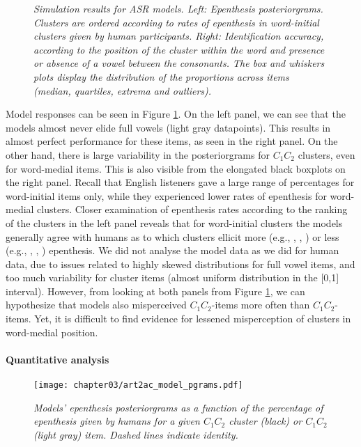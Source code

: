 {\begin{figure}[htb!]
    \caption{\textit{Simulation results for ASR models.
      Left: Epenthesis posteriorgrams. Clusters are ordered according to rates of epenthesis in word-initial clusters given by human participants. 
      Right: Identification accuracy, according to the position of the cluster within the word and presence or absence of a vowel between the consonants. The box and whiskers plots display the distribution of the proportions across items (median, quartiles, extrema and outliers).}}
    \label{fig:wpd-mod}
  \end{figure}

  Model responses can be seen in Figure \ref{fig:wpd-mod}. On the left panel, we can see that the models almost never elide full vowels (light gray datapoints). This results in almost perfect performance for these items, as seen in the right panel.
  On the other hand, there is large variability in the posteriorgrams for $C_{1}C_{2}$ clusters, even for word-medial items. This is also visible from the elongated black boxplots on the right panel. Recall that English listeners gave a large range of percentages for word-initial items only, while they experienced lower rates of epenthesis for word-medial clusters.
  Closer examination of epenthesis rates according to the ranking of the clusters in the left panel reveals that for word-initial clusters the models generally agree with humans as to which clusters ellicit more (e.g., , , ) or less (e.g., , , ) epenthesis.
  We did not analyse the model data as we did for human data, due to issues related to highly skewed distributions for full vowel items, and too much variability for cluster items (almost uniform distribution in the [0,1] interval). However, from looking at both panels from Figure \ref{fig:wpd-mod}, we can hypothesize that models also misperceived $C_{1}C_{2}$-items more often than $C_{1}$\textipa{[@]}$C_{2}$-items. Yet, it is difficult to find evidence for lessened misperception of clusters in word-medial position.  

\paragraph{Quantitative analysis}
\begin{figure}[htb!]
    \centering
    \texttt{[image: chapter03/art2ac\_model\_pgrams.pdf]}
    \caption{\textit{Models' epenthesis posteriorgrams as a function of the percentage of epenthesis given by humans for a given $C_{1}C_{2}$ cluster (black) or $C_{1}$\textipa{[@]}$C_{2}$ (light gray) item. Dashed lines indicate identity.}}
    \label{fig:wpd-corr}
  \end{figure}

}
